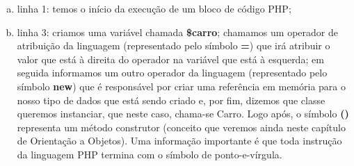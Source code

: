 \begin{enumerate}[a)]
    \item linha 1: temos o início da execução de um bloco de código PHP;
    \item linha 3: criamos uma variável chamada \textbf{\$carro};
    chamamos um operador de atribuição da linguagem (representado pelo símbolo
    \textbf{=}) que irá atribuir o valor que está à direita do operador na
    variável que está à esquerda; em seguida informamos um outro operador da
    linguagem (representado pelo símbolo \textbf{new}) que é responsável por
    criar uma referência em memória para o nosso tipo de dados que está sendo
    criado e, por fim, dizemos que classe queremos instanciar, que neste caso,
    chama-se Carro. Logo após, o símbolo \textbf{()} representa um método
    construtor (conceito que veremos ainda neste capítulo de Orientação a Objetos).
    Uma informação importante é que toda instrução da linguagem PHP termina
    com o símbolo de ponto-e-vírgula.
\end{enumerate}